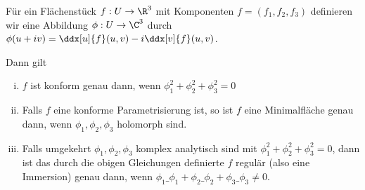 \begin{kor}
	Für ein Flächenstück $f: U \to \R^3$ mit Komponenten $f = (f_1, f_2, f_3)$ definieren wir eine Abbildung $\phi: U \to \C^3$ durch $\phi(u + iv) = \ddx[u]{f}(u,v) - i \ddx[v]{f}(u,v)$.

	Dann gilt
	\begin{enumerate}[(i)]
		\item
			$f$ ist konform genau dann, wenn $\phi_1^2 + \phi_2^2 + \phi_3^2 = 0$
		\item
			Falls $f$ eine konforme Parametrisierung ist, so ist $f$ eine Minimalfläche genau dann, wenn $\phi_1, \phi_2, \phi_3$ holomorph sind.
		\item
			Falls umgekehrt $\phi_1, \phi_2, \phi_3$ komplex analytisch sind mit $\phi_1^2 + \phi_2^2 + \phi_3^2 = 0$, dann ist das durch die obigen Gleichungen definierte $f$ regulär (also eine Immersion) genau dann, wenn $\phi_1\_{\phi_1} + \phi_2\_{\phi_2} + \phi_3\_{\phi_3} \neq 0$.
	\end{enumerate}
\end{kor}



